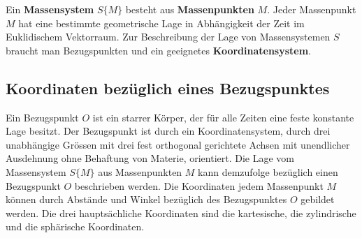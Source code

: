 Ein \textbf{Massensystem} $S\{M\}$ besteht aus \textbf{Massenpunkten} $M$. Jeder Massenpunkt $M$ hat eine bestimmte geometrische Lage in Abhängigkeit der Zeit im Euklidischem Vektorraum. Zur Beschreibung der Lage von Massensystemen $S$ braucht man Bezugspunkten und ein geeignetes \textbf{Koordinatensystem}.
\subsection{Koordinaten bezüglich eines Bezugspunktes}
Ein Bezugspunkt $O$ ist ein starrer Körper, der für alle Zeiten eine feste konstante Lage besitzt. Der Bezugspunkt ist durch ein Koordinatensystem, durch drei unabhängige Grössen mit drei fest orthogonal gerichtete Achsen mit unendlicher Ausdehnung ohne Behaftung von Materie, orientiert. 
\newline\newline
Die Lage vom Massensystem $S\{M\}$ aus Massenpunkten $M$ kann demzufolge bezüglich einen Bezugspunkt $O$ beschrieben werden. Die Koordinaten jedem Massenpunkt $M$ können durch Abstände und Winkel bezüglich des Bezugspunktes $O$ gebildet werden. Die drei hauptsächliche Koordinaten sind die kartesische, die zylindrische und die sphärische Koordinaten.
\newline\newline
